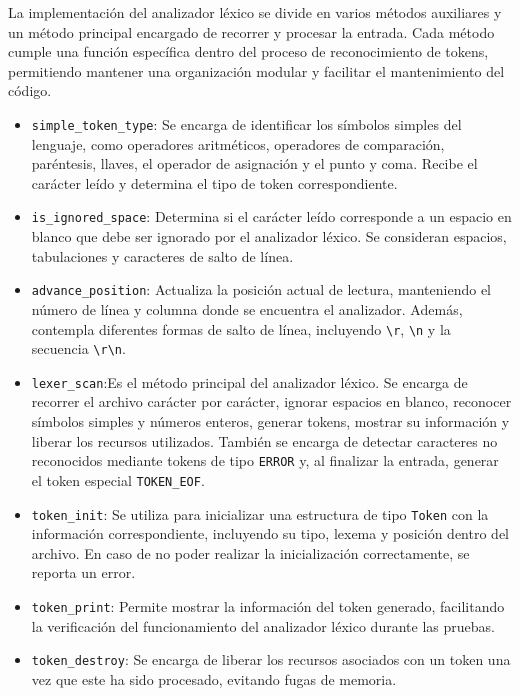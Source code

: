 \documentclass[12pt,letterpaper]{article}
\begin{document}
La implementación del analizador léxico se divide en varios métodos auxiliares y un método principal encargado de recorrer y procesar la entrada. Cada método cumple una función específica dentro del proceso de reconocimiento de tokens, permitiendo mantener una organización modular y facilitar el mantenimiento del código.

\begin{itemize}
\item \texttt{simple\_token\_type}: Se encarga de identificar los símbolos simples del lenguaje, como operadores aritméticos, operadores de comparación, paréntesis, llaves, el operador de asignación y el punto y coma. Recibe el carácter leído y determina el tipo de token correspondiente.
  
\item \texttt{is\_ignored\_space}: Determina si el carácter leído corresponde a un espacio en blanco que debe ser ignorado por el analizador léxico. Se consideran espacios, tabulaciones y caracteres de salto de línea.
  
\item \texttt{advance\_position}: Actualiza la posición actual de lectura, manteniendo el número de línea y columna donde se encuentra el analizador. Además, contempla diferentes formas de salto de línea, incluyendo \texttt{\textbackslash r}, \texttt{\textbackslash n} y la secuencia \texttt{\textbackslash r\textbackslash n}.
  
\item \texttt{lexer\_scan}:Es el método principal del analizador léxico. Se encarga de recorrer el archivo carácter por carácter, ignorar espacios en blanco, reconocer símbolos simples y números enteros, generar tokens, mostrar su información y liberar los recursos utilizados. También se encarga de detectar caracteres no reconocidos mediante tokens de tipo \texttt{ERROR} y, al finalizar la entrada, generar el token especial \texttt{TOKEN\_EOF}.
  
\item \texttt{token\_init}: Se utiliza para inicializar una estructura de tipo \texttt{Token} con la información correspondiente, incluyendo su tipo, lexema y posición dentro del archivo. En caso de no poder realizar la inicialización correctamente, se reporta un error.
  
\item \texttt{token\_print}: Permite mostrar la información del token generado, facilitando la verificación del funcionamiento del analizador léxico durante las pruebas.

\item \texttt{token\_destroy}: Se encarga de liberar los recursos asociados con un token una vez que este ha sido procesado, evitando fugas de memoria.
\end{itemize}
\end{document}
